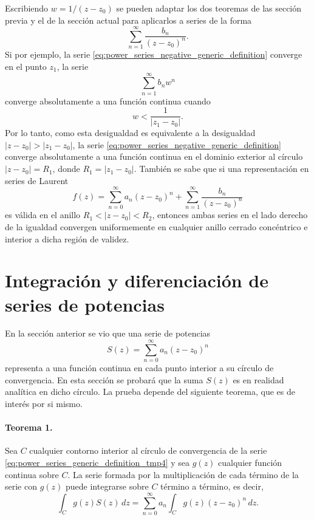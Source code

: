\documentclass[a4paper]{report}
\begin{document}
Escribiendo \(w=1/(z-z_0)\) se pueden adaptar los dos teoremas de las sección previa y el de la sección actual para aplicarlos a series de la forma 
\begin{equation}\label{eq:power_series_negative_generic_definition}
 \sum_{n=1}^\infty\frac{b_n}{(z-z_0)^n}.
\end{equation}
Si por ejemplo, la serie \ref{eq:power_series_negative_generic_definition} converge en el punto \(z_1\), la serie
\[
 \sum_{n=1}^\infty b_nw^n
\]
converge absolutamente a una función continua cuando 
\[
 w<\frac{1}{|z_1-z_0|}.
\]
Por lo tanto, como esta desigualdad es equivalente a la desigualdad \(|z-z_0|>|z_1-z_0|\), la serie \ref{eq:power_series_negative_generic_definition} converge absolutamente a una función continua en el dominio exterior al círculo \(|z-z_0|=R_1\), donde \(R_1=|z_1-z_0|\). También se sabe que si una representación en series de Laurent
\[
 f(z)=\sum_{n=0}^\infty a_n(z-z_0)^n+\sum_{n=1}^\infty\frac{b_n}{(z-z_0)^n}
\]
es válida en el anillo \(R_1<|z-z_0|<R_2\), entonces ambas series en el lado derecho de la igualdad convergen uniformemente en cualquier anillo cerrado concéntrico e interior a dicha región de validez.

\section{Integración y diferenciación de series de potencias}\label{sec:series_integration_differentiation}

En la sección anterior se vio que una serie de potencias
\begin{equation}\label{eq:power_series_generic_definition_tmp4}
 S(z)=\sum_{n=0}^\infty a_n(z-z_0)^n 
\end{equation}
representa a una función continua en cada punto interior a su círculo de convergencia. En esta sección se probará que la suma \(S(z)\) es en realidad analítica en dicho círculo. La prueba depende del siguiente teorema, que es de interés por si mismo. 

\paragraph{Teorema 1.} Sea \(C\) cualquier contorno interior al círculo de convergencia de la serie \ref{eq:power_series_generic_definition_tmp4} y sea \(g(z)\) cualquier función continua sobre \(C\). La serie formada por la multiplicación de cada término de la serie con \(g(z)\) puede integrarse sobre \(C\) término a término, es decir,
\begin{equation}\label{eq:series_integration_times_g}
 \int_C g(z)S(z)\,dz=\sum_{n=0}^\infty a_n\int_C g(z)(z-z_0)^n\,dz. 
\end{equation}
\end{document}
